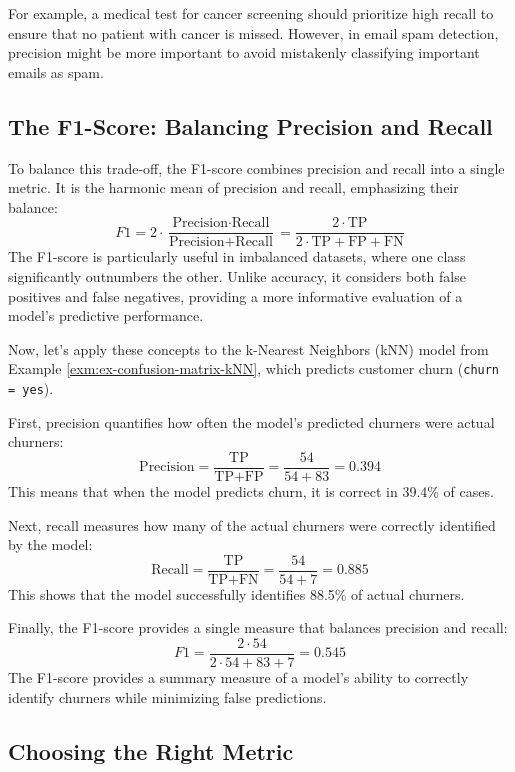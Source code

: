 \documentclass[
]{book}
\newcommand{\passthrough}[1]{#1}
\theoremstyle{definition}
\theoremstyle{definition}
\theoremstyle{definition}
\theoremstyle{definition}
\theoremstyle{remark}
\begin{document}
For example, a medical test for cancer screening should prioritize high recall to ensure that no patient with cancer is missed. However, in email spam detection, precision might be more important to avoid mistakenly classifying important emails as spam.

\subsection*{The F1-Score: Balancing Precision and Recall}\label{the-f1-score-balancing-precision-and-recall}

To balance this trade-off, the F1-score combines precision and recall into a single metric. It is the harmonic mean of precision and recall, emphasizing their balance:
\[
F1 = 2 \cdot \frac{\text{Precision} \cdot \text{Recall}}{\text{Precision} + \text{Recall}}
   = \frac{2 \cdot \text{TP}}{2 \cdot \text{TP} + \text{FP} + \text{FN}}
\]
The F1-score is particularly useful in imbalanced datasets, where one class significantly outnumbers the other. Unlike accuracy, it considers both false positives and false negatives, providing a more informative evaluation of a model's predictive performance.

Now, let's apply these concepts to the k-Nearest Neighbors (kNN) model from Example \ref{exm:ex-confusion-matrix-kNN}, which predicts customer churn (\passthrough{\lstinline!churn = yes!}).

First, precision quantifies how often the model's predicted churners were actual churners:\\
\[
\text{Precision} = \frac{\text{TP}}{\text{TP} + \text{FP}} = \frac{54}{54 + 83} = 0.394
\]
This means that when the model predicts churn, it is correct in 39.4\% of cases.

Next, recall measures how many of the actual churners were correctly identified by the model:
\[
\text{Recall} = \frac{\text{TP}}{\text{TP} + \text{FN}} = \frac{54}{54 + 7} = 0.885
\]
This shows that the model successfully identifies 88.5\% of actual churners.

Finally, the F1-score provides a single measure that balances precision and recall:
\[
F1 = \frac{2 \cdot 54}{2 \cdot 54 + 83 + 7} = 0.545
\]
The F1-score provides a summary measure of a model's ability to correctly identify churners while minimizing false predictions.

\subsection*{Choosing the Right Metric}\label{choosing-the-right-metric}
\end{document}
